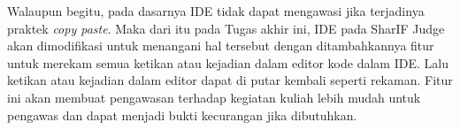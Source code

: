 Walaupun begitu, pada dasarnya IDE tidak dapat mengawasi jika terjadinya praktek \textit{copy paste}. Maka dari itu pada Tugas akhir ini, IDE pada SharIF Judge akan dimodifikasi untuk menangani hal tersebut dengan ditambahkannya fitur untuk merekam semua ketikan atau kejadian dalam editor kode dalam IDE. Lalu ketikan atau kejadian dalam editor dapat di putar kembali seperti rekaman. Fitur ini akan membuat pengawasan terhadap kegiatan kuliah lebih mudah untuk pengawas dan dapat menjadi bukti kecurangan jika dibutuhkan.

\begin{comment}
Ujian merupakan sebuah alat bantu untuk menilai pemahaman pelajar tentang ilmu yang diberikan oleh pengajar. Salah satu ujian yang diberikan kepada pelajar informatika adalah ujian koding yang biasanya dinilai berdasarkan ketepatan algoritma yang dipakai. Tetapi melakukan penilaian untuk setiap kode merupakan sebuah hal yang sulit untuk dilakukan karena dibutuhkannya waktu yang lama. Maka dari itu website \textit{judge} dibuat untuk memudahkan pekerjaan pengajar.

\textit{Judge} merupakan sebuah website yang akan menilai sebuah kode dengan menjalankannya berdasarkan masukkan yang ditentukan dan menyamakan keluaran dari kode dengan keluaran yang sudah ditetapkan oleh pembuat soal dalam kurun waktu yang ditetapkan. Oleh karena itu, kode yang dibuat harus dapat mencakupi waktu yang diberikan dengan mengunakan algoritma yang tepat. Bukan hanya menilai dengan keluaran yang tetap tetapi \textit{judge} juga dapat mengunakan kode yang sudah dibuat oleh pengajar dan membandingkannya dengan keluaran kode yang di kumpulkan.

Sudah banyak perguruan tinggi informatika yang mengunakan website \textit{judge} dalam pemeriksaan kode pelajar termasuk perguruan UNPAR untuk penilai kode dari para mahasiswanya. Judge yang digunakan adalah SharIF-Judge~\cite{sharif} yang dimodifikasi oleh Stillmen Vallian terhadap Sharif-Judge~\cite{stillmen:sharif} buatan Mohammad Javad Naderi dengan \textit{framework} CodeIgniter dan Bash. Gambar~\ref{fig:1:dashboardpng} merupakan halaman utama setelah masuk ke dalam website SharIF-Judge.

\begin{figure}[H]
    \centering
    \texttt{[image: dashboard]}
    \caption[Tampilan Awal SharIF Judge]{Tampilan Awal SharIF Judge}
    \label{fig:1:dashboardpng}
\end{figure}


\end{comment}
